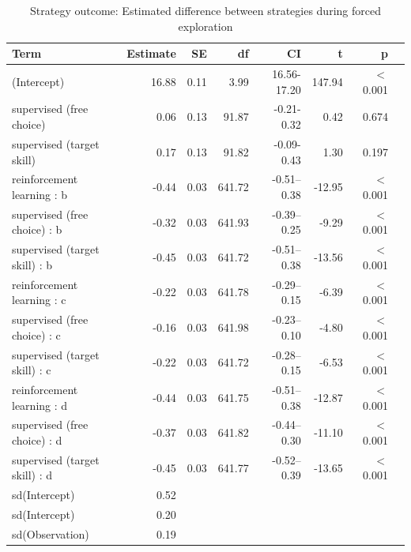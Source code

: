 \documentclass[pdflatex,sn-nature]{sn-jnl}%
\theoremstyle{thmstyleone}%
\theoremstyle{thmstyletwo}%
\theoremstyle{thmstylethree}%
\begin{document}
\begin{appendices}
\begin{table}[h!]
\caption{Strategy outcome: Estimated difference between strategies during forced exploration}\label{table_strategyoutcome_diffstrategy}
\centering
\begin{tabular}{lrrrrrrr}
  \hline
Term & Estimate & SE & df & CI & t & p \\ 
  \hline
 (Intercept) & 16.88 & 0.11 & 3.99 & 16.56-17.20 & 147.94 &  $<$  0.001 \\ 
  supervised (free choice) & 0.06 & 0.13 & 91.87 & -0.21-0.32 & 0.42 &    0.674 \\ 
   supervised (target skill) & 0.17 & 0.13 & 91.82 & -0.09-0.43 & 1.30 &    0.197 \\ 
   reinforcement learning : b & -0.44 & 0.03 & 641.72 & -0.51--0.38 & -12.95 &  $<$  0.001 \\ 
  supervised (free choice) : b & -0.32 & 0.03 & 641.93 & -0.39--0.25 & -9.29 &  $<$  0.001 \\ 
   supervised (target skill) : b & -0.45 & 0.03 & 641.72 & -0.51--0.38 & -13.56 &  $<$  0.001 \\ 
  reinforcement learning : c & -0.22 & 0.03 & 641.78 & -0.29--0.15 & -6.39 &  $<$  0.001 \\ 
  supervised (free choice) : c & -0.16 & 0.03 & 641.98 & -0.23--0.10 & -4.80 &  $<$  0.001 \\ 
  supervised (target skill) : c & -0.22 & 0.03 & 641.72 & -0.28--0.15 & -6.53 &  $<$  0.001 \\ 
  reinforcement learning : d & -0.44 & 0.03 & 641.75 & -0.51--0.38 & -12.87 &  $<$  0.001 \\ 
  supervised (free choice) : d & -0.37 & 0.03 & 641.82 & -0.44--0.30 & -11.10 &  $<$  0.001 \\ 
  supervised (target skill) : d & -0.45 & 0.03 & 641.77 & -0.52--0.39 & -13.65 &  $<$  0.001 \\ 
  sd(Intercept) & 0.52 &  &  &  &  &  \\ 
  sd(Intercept) & 0.20 &  &  &  &  &   \\ 
  sd(Observation) & 0.19 &  &  &  &  &   \\ 
   \hline
\end{tabular}
\end{table}





\end{appendices}
\end{document}
